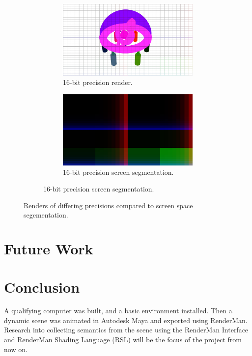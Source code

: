 \documentclass[conference]{IEEEtran}
\begin{document}
\begin{figure}[htbp]
\begin{subfigure}{\textwidth}
\begin{subfigure}{.49\textwidth}
      \centering
      \includegraphics[width=\linewidth]{16_render_cropped.jpg}
      \caption{16-bit precision render.}
      \label{fig:render_8}
    \end{subfigure}
    \begin{subfigure}{.49\textwidth}
      \centering
      \includegraphics[width=\linewidth]{16_partition_cropped.jpg}
      \caption{16-bit precision screen segmentation.}
      \label{fig:render_8}
    \end{subfigure}
  \label{fig:render_16}
\end{subfigure}
\caption{Renders of differing precisions compared to screen space segementation.}
\label{fig:render_comparisons}
\end{figure}

\section{Future Work}

\section{Conclusion}
\label{sec:conclusion}
A qualifying computer was built, and a basic environment installed.
Then a dynamic scene was animated in Autodesk Maya and exported
using RenderMan. Research into collecting semantics from the scene using
the RenderMan Interface and RenderMan Shading Language (RSL)
will be the focus of the project from now on.
\end{document}
